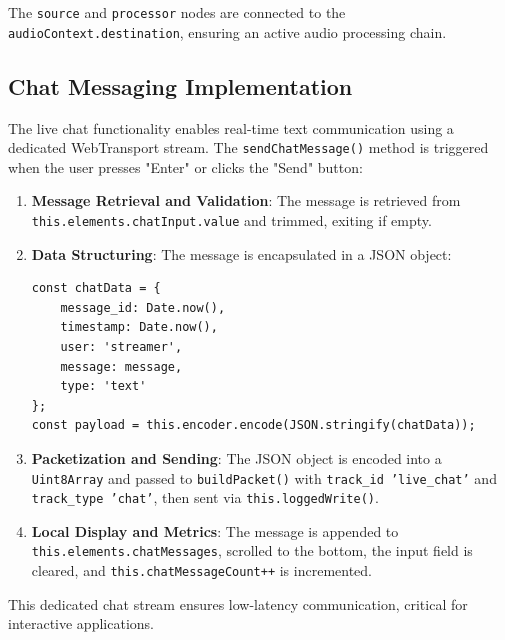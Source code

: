 The \texttt{source} and \texttt{processor} nodes are connected to the \texttt{audioContext.destination}, ensuring an active audio processing chain.

\subsection{Chat Messaging Implementation}
The live chat functionality enables real-time text communication using a dedicated WebTransport stream. The \texttt{sendChatMessage()} method is triggered when the user presses "Enter" or clicks the "Send" button:

\begin{enumerate}
    \item \textbf{Message Retrieval and Validation}: The message is retrieved from \texttt{this.elements.chatInput.value} and trimmed, exiting if empty.
    \item \textbf{Data Structuring}: The message is encapsulated in a JSON object:
    \begin{lstlisting}
const chatData = {
    message_id: Date.now(),
    timestamp: Date.now(),
    user: 'streamer',
    message: message,
    type: 'text'
};
const payload = this.encoder.encode(JSON.stringify(chatData));
    \end{lstlisting}
    \item \textbf{Packetization and Sending}: The JSON object is encoded into a \texttt{Uint8Array} and passed to \texttt{buildPacket()} with \texttt{track\_id 'live\_chat'} and \texttt{track\_type 'chat'}, then sent via \texttt{this.loggedWrite()}.
    \item \textbf{Local Display and Metrics}: The message is appended to \texttt{this.elements.chatMessages}, scrolled to the bottom, the input field is cleared, and \texttt{this.chatMessageCount++} is incremented.
\end{enumerate}

This dedicated chat stream ensures low-latency communication, critical for interactive applications.



